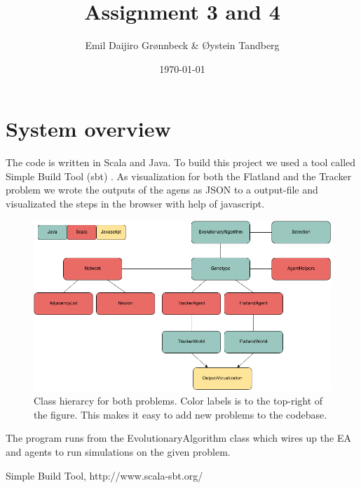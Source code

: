\documentclass{article}
\begin{document}
\title{Assignment 3 and 4}
\author{Emil Daijiro Grønnbeck \& Øystein Tandberg}
\date{\today}
\maketitle

\section{System overview}
The code is written in Scala and Java. To build this project we used a tool called Simple Build Tool (sbt) \cite{sbt}. As visualization for both the Flatland and the Tracker problem we wrote the outputs of the agens as JSON to a output-file and visualizated the steps in the browser with help of javascript. 

\begin{figure}[H]
  \centering
    \includegraphics[width=1.0\textwidth]{img/class_diagram}
    \caption{Class hierarcy for both problems. Color labels is to the top-right of the figure. This makes it easy to add new problems to the codebase.}
\end{figure}

The program runs from the EvolutionaryAlgorithm class which wires up the EA and agents to run simulations on the given problem. 


\newpage


\begin{thebibliography}{9}
	  Simple Build Tool, http://www.scala-sbt.org/
\end{thebibliography}
\end{document}
